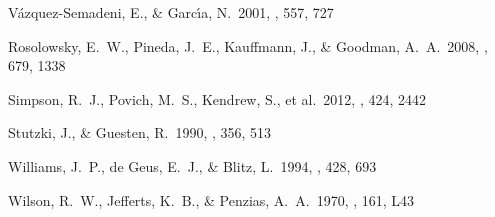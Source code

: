 \begin{thebibliography}{16}
 V{\'a}zquez-Semadeni, E., \& Garc{\'{\i}}a, N.\ 2001, \apj, 557, 727 

 Rosolowsky, E.~W., 
Pineda, J.~E., Kauffmann, J., \& Goodman, A.~A.\ 2008, \apj, 679, 1338 

 Simpson, R.~J., Povich, 
M.~S., Kendrew, S., et al.\ 2012, \mnras, 424, 2442 

 Stutzki, J., \& Guesten, R.\ 1990, \apj, 356, 513

 Williams, J.~P., de 
Geus, E.~J., \& Blitz, L.\ 1994, \apj, 428, 693

 Wilson, R.~W., Jefferts, 
K.~B., \& Penzias, A.~A.\ 1970, \apjl, 161, L43

\end{thebibliography}

